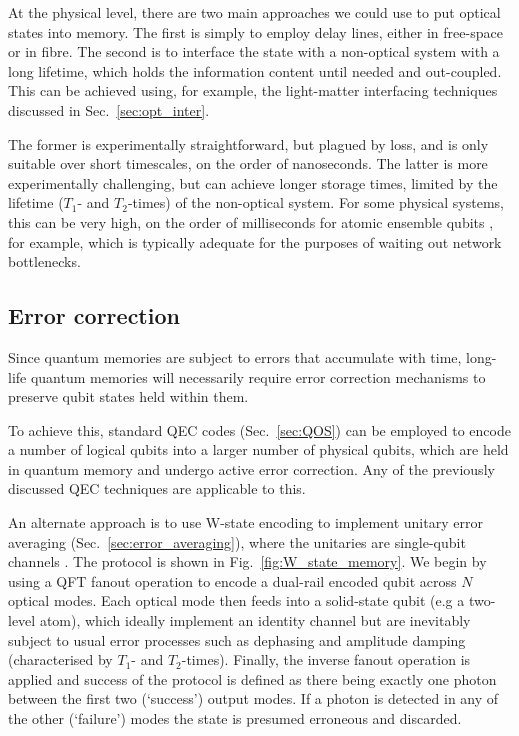 At the physical level, there are two main approaches we could use to put optical states into memory. The first is simply to employ delay lines, either in free-space or in fibre. The second is to interface the state with a non-optical system with a long lifetime, which holds the information content until needed and out-coupled. This can be achieved using, for example, the light-matter interfacing techniques discussed in Sec.~\ref{sec:opt_inter}.

The former is experimentally straightforward, but plagued by loss, and is only suitable over short timescales, on the order of nanoseconds. The latter is more experimentally challenging, but can achieve longer storage times, limited by the lifetime ($T_1$- and $T_2$-times) of the non-optical system. For some physical systems, this can be very high, on the order of milliseconds for atomic ensemble qubits \cite{bib:Duan01, bib:Duan02, bib:LauratKimble07}, for example, which is typically adequate for the purposes of waiting out network bottlenecks.

%
%

\subsection{Error correction}

Since quantum memories are subject to errors that accumulate with time, long-life quantum memories will necessarily require error correction mechanisms to preserve qubit states held within them.

To achieve this, standard QEC codes (Sec.~\ref{sec:QOS}) can be employed to encode a number of logical qubits into a larger number of physical qubits, which are held in quantum memory and undergo active error correction. Any of the previously discussed QEC techniques are applicable to this.

An alternate approach is to use W-state encoding to implement unitary error averaging (Sec.~\ref{sec:error_averaging}), where the unitaries are single-qubit channels \cite{errorfilteringpaper, bib:MadhavPeterLund}. The protocol is shown in Fig.~\ref{fig:W_state_memory}. We begin by using a QFT fanout operation to encode a dual-rail encoded qubit across $N$ optical modes. Each optical mode then feeds into a solid-state qubit (e.g a two-level atom), which ideally implement an identity channel but are inevitably subject to usual error processes such as dephasing and amplitude damping (characterised by $T_1$- and $T_2$-times). Finally, the inverse fanout operation is applied and success of the protocol is defined as there being exactly one photon between the first two (`success') output modes. If a photon is detected in any of the other (`failure') modes the state is presumed erroneous and discarded.

